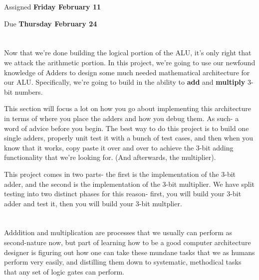 \documentclass{article}
\begin{document}
\large

{\selectfont{\Huge CMSC389E Project 2: \par Arithmetic Logic Unit- \par Adders \& Multipliers}}

Assigned \textbf{Friday February 11}

Due \textbf{Thursday February 24}

\section{\selectfont{The Joy of Mathematics}}

Now that we're done building the logical portion of the ALU, it's only right that we attack the arithmetic portion. In this project, we're going to use our newfound knowledge of Adders to design some much needed mathematical architecture for our ALU. Specifically, we're going to build in the ability to \textbf{add} and \textbf{multiply} 3-bit numbers.

This section will focus a lot on how you go about implementing this architecture in terms of where you place the adders and how you debug them. As such- a word of advice before you begin. The best way to do this project is to build one single adders, properly unit test it with a bunch of test cases, and then when you know that it works, copy paste it over and over to achieve the 3-bit adding functionality that we're looking for. (And afterwards, the multiplier).

This project comes in two parts- the first is the implementation of the 3-bit adder, and the second is the implementation of the 3-bit multiplier.
We have split testing into two distinct phases for this reason- first, you will build your 3-bit adder and test it, then you will build your 3-bit multplier.

\section{\selectfont{Conceptual Overview: Addition and Multiplication}}

Adddition and multiplication are processes that we usually can perform as second-nature now, but part of learning how to be a good computer architecture designer is figuring out how one can take these mundane tasks that we as humans perform very easily, and distilling them down to systematic, methodical tasks that any set of logic gates can perform.
\end{document}
